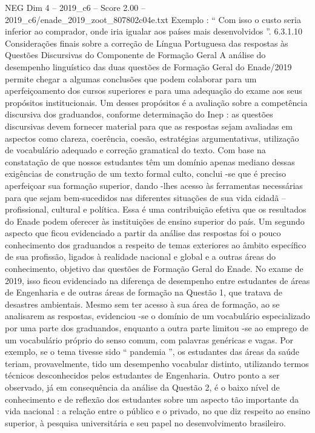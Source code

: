 \begin{textsample}{NEG Dim 4 – 2019\_c6 – Score 2.00 – 2019\_c6/enade\_2019\_zoot\_807802c04e.txt}
Exemplo : “ Com isso o custo seria inferior ao comprador, onde iria igualar aos países mais desenvolvidos ”. 6.3.1.10 Considerações finais sobre a correção de Língua Portuguesa das respostas às Questões Discursivas do Componente de Formação Geral A análise do desempenho linguístico das duas questões de Formação Geral do Enade/2019 permite chegar a algumas conclusões que podem colaborar para um aperfeiçoamento dos cursos superiores e para uma adequação do exame aos seus propósitos institucionais.
Um desses propósitos é a avaliação sobre a competência discursiva dos graduandos, conforme determinação do Inep : as questões discursivas devem fornecer material para que as respostas sejam avaliadas em aspectos como clareza, coerência, coesão, estratégias argumentativas, utilização de vocabulário adequado e correção gramatical do texto.
Com base na constatação de que nossos estudantes têm um domínio apenas mediano dessas exigências de construção de um texto formal culto, conclui -se que é preciso aperfeiçoar sua formação superior, dando -lhes acesso às ferramentas necessárias para que sejam bem-sucedidos nas diferentes situações de sua vida cidadã – profissional, cultural e política.
Essa é uma contribuição efetiva que os resultados do Enade podem oferecer às instituições de ensino superior do país.
Um segundo aspecto que ficou evidenciado a partir da análise das respostas foi o pouco conhecimento dos graduandos a respeito de temas exteriores ao âmbito específico de sua profissão, ligados à realidade nacional e global e a outras áreas do conhecimento, objetivo das questões de Formação Geral do Enade.
No exame de 2019, isso ficou evidenciado na diferença de desempenho entre estudantes de áreas de Engenharia e de outras áreas de formação na Questão 1, que tratava de desastres ambientais.
Mesmo sem ter acesso à sua área de formação, ao se analisarem as respostas, evidenciou -se o domínio de um vocabulário especializado por uma parte dos graduandos, enquanto a outra parte limitou -se ao emprego de um vocabulário próprio do senso comum, com palavras genéricas e vagas.
Por exemplo, se o tema tivesse sido “ pandemia ”, os estudantes das áreas da saúde teriam, provavelmente, tido um desempenho vocabular distinto, utilizando termos técnicos desconhecidos pelos estudantes de Engenharia.
Outro ponto a ser observado, já em consequência da análise da Questão 2, é o baixo nível de conhecimento e de reflexão dos estudantes sobre um aspecto tão importante da vida nacional : a relação entre o público e o privado, no que diz respeito ao ensino superior, à pesquisa universitária e seu papel no desenvolvimento brasileiro.

\end{textsample}
